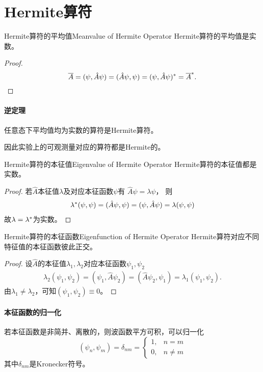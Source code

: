\section{Hermite算符}
\begin{theorem}{Hermite算符的平均值}{Meanvalue of Hermite Operator}
	Hermite算符的平均值是实数。
	\begin{proof}
		\[
			\overline{A}=(\psi,\hat A\psi)=(\hat A\psi,\psi)=(\psi,\hat A\psi)^\ast=\overline{A}^\ast.\qedhere
		\]
	\end{proof}
	\tcblower
	\paragraph{逆定理}任意态下平均值均为实数的算符是Hermite算符。
\end{theorem}
因此实验上的可观测量对应的算符都是Hermite的。
\begin{theorem}{Hermite算符的本征值}{Eigenvalue of Hermite Operator}
	Hermite算符的本征值都是实数。
	\begin{proof}
		若$\hat A$本征值$\lambda$及对应本征函数$\psi$有
		\(\hat A\psi=\lambda\psi\)，
		则
		\begin{gather*}
			\lambda^\ast(\psi,\psi)=(\hat A\psi,\psi)=(\psi,\hat A\psi)=\lambda(\psi,\psi)
		\end{gather*}
		故$\lambda=\lambda^\ast$为实数。
	\end{proof}
\end{theorem}
\begin{theorem}{Hermite算符的本征函数}{Eigenfunction of Hermite Operator}
	Hermite算符对应不同特征值的本征函数彼此正交。
	\begin{proof}
		设$\hat A$的本征值$\lambda_1,\lambda_2$对应本征函数$\psi_1,\psi_2$
		\begin{gather*}
			\lambda_2(\psi_1,\psi_2)=(\psi_1,\hat A\psi_2)=(\hat A\psi_2,\psi_1)=\lambda_1(\psi_1,\psi_2).
		\end{gather*}
		由$\lambda_1\neq\lambda_2$，可知$(\psi_1,\psi_2)\equiv 0$。
	\end{proof}
\end{theorem}
\paragraph{本征函数的归一化}若本征函数是非简并、离散的，则波函数平方可积，可以归一化
\[
	(\psi_n,\psi_m)=\delta_{nm}=\begin{cases}
		1, & n=m \\0,&n\neq m
	\end{cases}
\]
其中$\delta_{nm}$是Kronecker符号。

